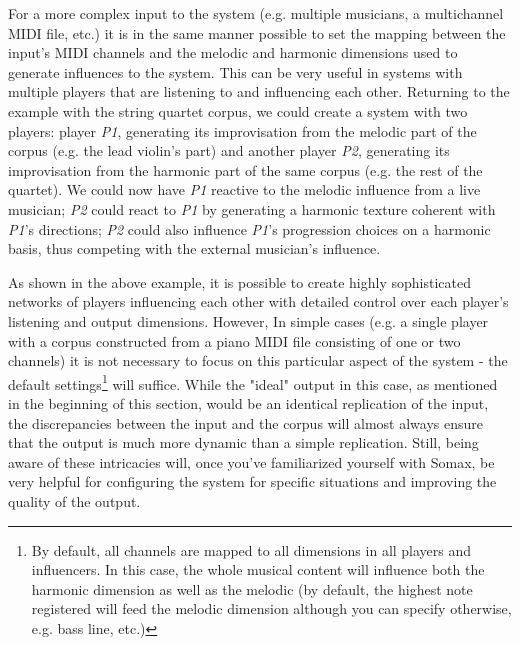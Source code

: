 For a more complex input to the system (e.g. multiple musicians, a multichannel MIDI file, etc.) it is in the same manner possible to  set the mapping between the input's MIDI channels and the melodic and harmonic dimensions used to generate influences to the system. This can be very useful in systems with multiple players that are listening to and influencing each other. Returning to the example with the string quartet corpus, we could create a system with two players: player \textit{P1}, generating its improvisation from the melodic part of the corpus (e.g. the lead violin's part) and another player \textit{P2}, generating its improvisation from the harmonic part of the same corpus (e.g. the rest of the quartet). We could now have \textit{P1} reactive to the melodic influence from a live musician; \textit{P2} could react to \textit{P1} by generating a harmonic texture coherent with \textit{P1}'s directions; \textit{P2} could also influence \textit{P1}'s progression choices on a harmonic basis, thus competing with the external musician's influence. 

As shown in the above example, it is possible to create highly sophisticated networks of players influencing each other with detailed control over each player's listening and output dimensions. However, In simple cases (e.g. a single player with a corpus constructed from a piano MIDI file consisting of one or two channels) it is not necessary to focus on this particular aspect of the system -  the default settings\footnote{By default,  all channels are mapped to all dimensions in all players and influencers. In this case, the whole musical content will influence both the harmonic dimension as well as the melodic (by default, the highest note registered will feed the melodic dimension although you can specify otherwise, e.g. bass line, etc.)} will suffice. While the "ideal" output in this case, as mentioned in the beginning of this section, would be an identical replication of the input, the discrepancies between the input and the corpus will almost always ensure that the output is much more dynamic than a simple replication. Still, being aware of these intricacies will, once you've familiarized yourself with Somax, be very helpful for configuring the system for specific situations and improving the quality of the output.
